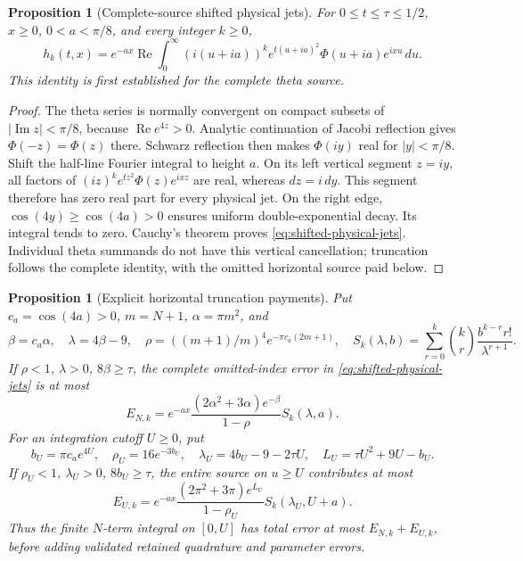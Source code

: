 \documentclass[11pt]{article}
\numberwithin{equation}{section}
\newtheorem{proposition}[theorem]{Proposition}
\theoremstyle{definition}
\theoremstyle{remark}
\begin{document}
\begin{proposition}[Complete-source shifted physical jets]
\label{prop:shifted-physical-jets}
For \(0\le t\le\tau\le1/2\), \(x\ge0\), \(0<a<\pi/8\), and
every integer \(k\ge0\),
\begin{equation}
 h_k(t,x)=e^{-ax}\operatorname{Re}\int_0^\infty
 (i(u+ia))^k e^{t(u+ia)^2}\Phi(u+ia)e^{ixu}\,du.
 \label{eq:shifted-physical-jets}
\end{equation}
This identity is first established for the complete theta source.
\end{proposition}

\begin{proof}
The theta series is normally convergent on compact subsets of
\(|\operatorname{Im}z|<\pi/8\), because
\(\operatorname{Re}e^{4z}>0\). Analytic continuation of Jacobi
reflection gives \(\Phi(-z)=\Phi(z)\) there. Schwarz reflection then
makes \(\Phi(iy)\) real for \(|y|<\pi/8\).
Shift the half-line Fourier integral to height \(a\). On its left
vertical segment \(z=iy\), all factors of
\((iz)^ke^{tz^2}\Phi(z)e^{ixz}\) are real, whereas \(dz=i\,dy\).
This segment therefore has zero real part for every physical jet.
On the right edge, \(\cos(4y)\ge\cos(4a)>0\) ensures uniform
double-exponential decay. Its integral tends to zero. Cauchy's theorem
proves \eqref{eq:shifted-physical-jets}. Individual theta summands do
not have this vertical cancellation; truncation follows the complete
identity, with the omitted horizontal source paid below.
\end{proof}

\begin{proposition}[Explicit horizontal truncation payments]
\label{prop:shifted-truncation-payments}
Put \(c_a=\cos(4a)>0\), \(m=N+1\), \(\alpha=\pi m^2\), and
\[
 \beta=c_a\alpha,\quad \lambda=4\beta-9,\quad
 \rho=((m+1)/m)^4e^{-\pi c_a(2m+1)},\quad
 S_k(\lambda,b)=\sum_{r=0}^k\binom kr\frac{b^{k-r}r!}{\lambda^{r+1}}.
\]
If \(\rho<1\), \(\lambda>0\), \(8\beta\ge\tau\), the complete
omitted-index error in \eqref{eq:shifted-physical-jets} is at most
\begin{equation}
 E_{N,k}=e^{-ax}
 \frac{(2\alpha^2+3\alpha)e^{-\beta}}{1-\rho}S_k(\lambda,a).
 \label{eq:shifted-index-payment}
\end{equation}
For an integration cutoff \(U\ge0\), put
\[
 b_U=\pi c_a e^{4U},\quad \rho_U=16e^{-3b_U},\quad
 \lambda_U=4b_U-9-2\tau U,\quad L_U=\tau U^2+9U-b_U.
\]
If \(\rho_U<1\), \(\lambda_U>0\), \(8b_U\ge\tau\), the entire
source on \(u\ge U\) contributes at most
\begin{equation}
 E_{U,k}=e^{-ax}
 \frac{(2\pi^2+3\pi)e^{L_U}}{1-\rho_U}S_k(\lambda_U,U+a).
 \label{eq:shifted-integration-payment}
\end{equation}
Thus the finite \(N\)-term integral on \([0,U]\) has total error
at most \(E_{N,k}+E_{U,k}\), before adding validated retained
quadrature and parameter errors.
\end{proposition}
\end{document}
